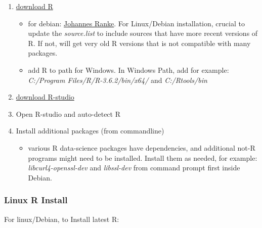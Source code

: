 \documentclass[]{article}
\providecommand{\tightlist}{%
  \setlength{\itemsep}{0pt}\setlength{\parskip}{0pt}}
\begin{document}
\begin{enumerate}
\def\labelenumi{\arabic{enumi}.}
\tightlist
\item
  \href{https://cloud.r-project.org/}{download R}

  \begin{itemize}
  \tightlist
  \item
    for debian:
    \href{https://cran.r-project.org/bin/linux/debian/}{Johannes Ranke}.
    For Linux/Debian installation, crucial to update the
    \emph{source.list} to include sources that have more recent versions
    of R. If not, will get very old R versions that is not compatible
    with many packages.
  \item
    add R to path for Windows. In Windows Path, add for example:
    \emph{C:/Program Files/R/R-3.6.2/bin/x64/} and \emph{C:/Rtools/bin}
  \end{itemize}
\item
  \href{https://rstudio.com/products/rstudio/download/}{download
  R-studio}
\item
  Open R-studio and auto-detect R
\item
  Install additional packages (from commandline)

  \begin{itemize}
  \tightlist
  \item
    various R data-science packages have dependencies, and additional
    not-R programs might need to be installed. Install them as needed,
    for example: \emph{libcurl4-openssl-dev} and \emph{libssl-dev} from
    command prompt first inside Debian.
  \end{itemize}
\end{enumerate}

\hypertarget{linux-r-install}{%
\subsubsection{Linux R Install}\label{linux-r-install}}

For linux/Debian, to Install latest R:
\end{document}
